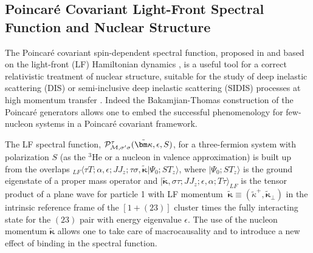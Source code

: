 \subsection{Poincar\'e Covariant Light-Front Spectral Function and Nuclear Structure}
{The Poincar\'e covariant spin-dependent spectral function, proposed in \cite{PhysRevC.95.014001, Pace:2013bq,Scopetta:2014yoa, Pace:2016eiq} and based on  the light-front (LF) Hamiltonian dynamics \cite{Dirac:1949cp, Keister:1991sb},  is a useful tool for a correct relativistic treatment  of nuclear structure, suitable for the study of deep inelastic scattering (DIS) or semi-inclusive deep inelastic scattering (SIDIS) processes at high momentum transfer \cite{mar,sid1,sid2}.}
 {Indeed the Bakamjian-Thomas construction \cite{Bakamjian:1953kh} of the Poincar\'e generators 
  allows one to embed the successful phenomenology for few-nucleon systems in a
Poincar\'e covariant framework.}

The LF spectral function, ${{\cal P}^{\tau}_{{\cal M},\sigma'\sigma}({ \tilde {\bm \kappa}},\epsilon,S)}$,
for a three-fermion system with polarization $S$ (as the $^3\mathrm{He}$ or a nucleon in valence approximation) is built up from the overlaps $_{LF}\langle  \tau T ; 
\alpha,\epsilon ;J J_{z}; \tau\sigma,\tilde{\bm \kappa}|\Psi_{0}; S T_z \rangle$, where $|\Psi_{0}; S T_z \rangle$ is the ground eigenstate of a proper mass operator \cite{PhysRevC.95.014001, Pace:2013bq,Scopetta:2014yoa, Pace:2016eiq} and 
$|\tilde{\bm \kappa}, \sigma \tau; J_{} J_{z}; \epsilon,\alpha;T \tau \rangle_{LF}$ is the tensor product of a plane wave for particle 1 with LF momentum $~ \tilde{\bm \kappa} \equiv (\tilde{\kappa}^+,{\tilde{\bm \kappa}_\perp})$ in the {{intrinsic reference frame of the $[1+(23)]$ cluster}} 
 times the fully interacting  state for {the} $(23)$ pair with  energy eigenvalue $\epsilon$.
{{The use of the nucleon momentum {{${\tilde{\bm \kappa}}$}}
   allows one  to take care of macrocausality \cite{Keister:1991sb} and  to introduce 
   {{a new effect of binding in the spectral function.}}}}


